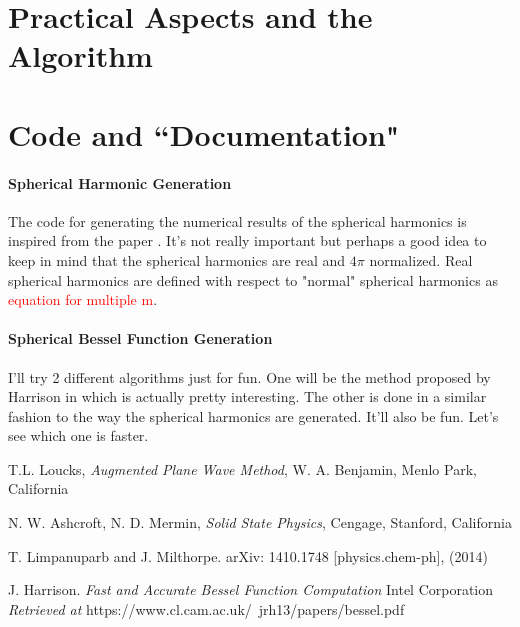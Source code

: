 \documentclass[11pt]{article}
\numberwithin{equation}{section}
\begin{document}
\section{Practical Aspects and the Algorithm}

\section{Code and ``Documentation"}

\paragraph{Spherical Harmonic Generation}
The code for generating the numerical results of the spherical harmonics is inspired from the paper \cite{spherHarm}. It's not really important but perhaps a good idea to keep in mind that the spherical harmonics are real and $4\pi$ normalized. Real spherical harmonics are defined with respect to "normal" spherical harmonics as \textcolor{red}{equation for multiple m}.

\paragraph{Spherical Bessel Function Generation}
I'll try 2 different algorithms just for fun. One will be the method proposed by Harrison in \cite{spherBessel} which is actually pretty interesting. The other is done in a similar fashion to the way the spherical harmonics are generated. It'll also be fun. Let's see which one is faster.



\begin{thebibliography}{99}

  T.L. Loucks, \textit{Augmented Plane Wave Method}, W. A. Benjamin, Menlo Park, California
  
  N. W. Ashcroft, N. D. Mermin, \textit{Solid State Physics}, Cengage, Stanford, California
  
  T. Limpanuparb and J. Milthorpe. arXiv: 1410.1748 [physics.chem-ph], (2014)
  
  J. Harrison. \textit{Fast and Accurate Bessel Function Computation} Intel Corporation \\
  \textit{Retrieved at } https://www.cl.cam.ac.uk/~jrh13/papers/bessel.pdf
  

\end{thebibliography}
\end{document}
